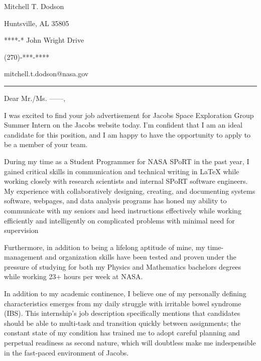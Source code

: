 \documentclass[12pt]{article}
\begin{document}
\begin{center}
        {\color{OliveGreen}\LARGE{Mitchell T. Dodson}}

        \vspace{1em}

	\noindent
        \begin{minipage}[t]{.48\textwidth}

		\noindent
                Huntsville, AL 35805

		\noindent
                ****-* John Wright Drive

        \end{minipage}
        \begin{minipage}[t]{.48\textwidth}

                \hfill
                (270)-***-****

                \hfill
                mitchell.t.dodson@nasa.gov

        \end{minipage}
\end{center}

\hrule

\vspace{2em}

\noindent
Dear Mr./Ms. ------,

\vspace{1em}
I was excited to find your job advertisement for Jacobs Space Exploration Group Summer Intern on the Jacobs website today. I'm confident that I am an ideal candidate for this position, and I am happy to have the opportunity to apply to be a member of your team.

During my time as a Student Programmer for NASA SPoRT in the past year, I gained critical skills in communication and technical writing in LaTeX while working closely with research scientists and internal SPoRT software engineers. My experience with collaboratively designing, creating, and documenting systems software, webpages, and data analysis programs has honed my ability to communicate with my seniors and heed instructions effectively while working efficiently and intelligently on complicated problems with minimal need for supervision

Furthermore, in addition to being a lifelong aptitude of mine, my time-management and organization skills have been tested and proven under the pressure of studying for both my Physics and Mathematics bachelors degrees while working 23+ hours per week at NASA.

In addition to my academic continence, I believe one of my personally defining characteristics emerges from my daily struggle with irritable bowel syndrome (IBS). This internship's job description specifically mentions that candidates should be able to multi-task and transition quickly between assignments; the constant state of my condition has trained me to adopt careful planning and perpetual readiness as second nature, which will doubtless make me indespensible in the fast-paced environment of Jacobs.
\end{document}
